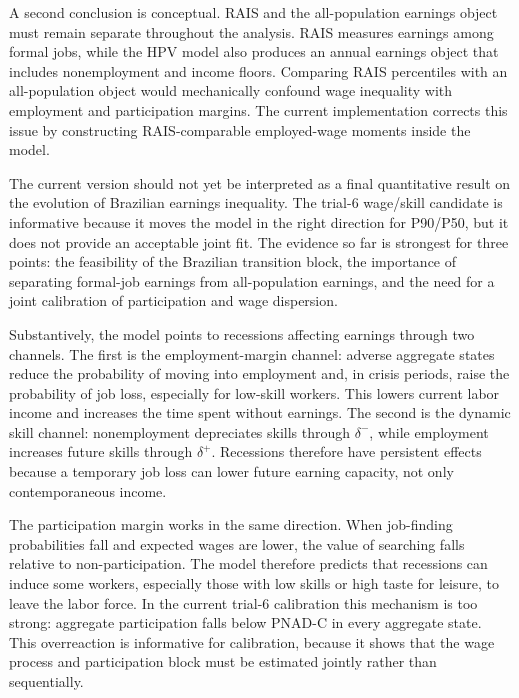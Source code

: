 \documentclass[12pt]{article}
\begin{document}
	A second conclusion is conceptual. RAIS and the all-population earnings object must remain separate throughout the analysis. RAIS measures earnings among formal jobs, while the HPV model also produces an annual earnings object that includes nonemployment and income floors. Comparing RAIS percentiles with an all-population object would mechanically confound wage inequality with employment and participation margins. The current implementation corrects this issue by constructing RAIS-comparable employed-wage moments inside the model.

	The current version should not yet be interpreted as a final quantitative result on the evolution of Brazilian earnings inequality. The trial-6 wage/skill candidate is informative because it moves the model in the right direction for P90/P50, but it does not provide an acceptable joint fit. The evidence so far is strongest for three points: the feasibility of the Brazilian transition block, the importance of separating formal-job earnings from all-population earnings, and the need for a joint calibration of participation and wage dispersion.

	Substantively, the model points to recessions affecting earnings through two channels. The first is the employment-margin channel: adverse aggregate states reduce the probability of moving into employment and, in crisis periods, raise the probability of job loss, especially for low-skill workers. This lowers current labor income and increases the time spent without earnings. The second is the dynamic skill channel: nonemployment depreciates skills through $\delta^-$, while employment increases future skills through $\delta^+$. Recessions therefore have persistent effects because a temporary job loss can lower future earning capacity, not only contemporaneous income.

	The participation margin works in the same direction. When job-finding probabilities fall and expected wages are lower, the value of searching falls relative to non-participation. The model therefore predicts that recessions can induce some workers, especially those with low skills or high taste for leisure, to leave the labor force. In the current trial-6 calibration this mechanism is too strong: aggregate participation falls below PNAD-C in every aggregate state. This overreaction is informative for calibration, because it shows that the wage process and participation block must be estimated jointly rather than sequentially.
\end{document}
